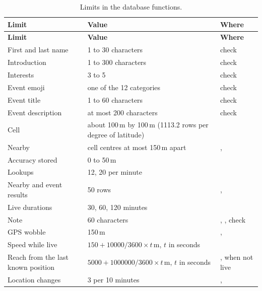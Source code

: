 \begingroup\tablefont
\begin{longtable}{@{}L{60mm}L{36mm}L{\dimexpr\linewidth-96mm-4\tabcolsep\relax}@{}}
  \caption{Limits in the database functions.}
  \label{tab:server-constants}\\
  \toprule
  \textsf{\textbf{Limit}} & \textsf{\textbf{Value}} & \textsf{\textbf{Where}} \\
  \midrule
  \endfirsthead
  \toprule
  \textsf{\textbf{Limit}} & \textsf{\textbf{Value}} & \textsf{\textbf{Where}} \\
  \midrule
  \endhead
  \bottomrule
  \endfoot
  First and last name & 1 to 30 characters &  check \\
  Introduction & 1 to 300 characters &  check \\
  Interests & 3 to 5 &  check \\
  Event emoji & one of the 12 categories &  check \\
  Event title & 1 to 60 characters &  check \\
  Event description & at most 200 characters &  check \\
  Cell & about 100\,m by 100\,m (1113.2 rows per degree of latitude) &  \\
  Nearby & cell centres at most 150\,m apart & ,  \\
  Accuracy stored & 0 to 50\,m &  \\
  Lookups &  12,  20 per minute &  \\
  Nearby and event results & 50 rows & ,  \\
  Live durations & 30, 60, 120 minutes &  \\
  Note & 60 characters & , , check \\
  GPS wobble & 150\,m & ,  \\
  Speed while live & $150 + 10000/3600 \times t$\,m, $t$ in seconds &  \\
  Reach from the last known position & $5000 + 1000000/3600 \times t$\,m, $t$ in seconds & ,  when not live \\
  Location changes & 3 per 10 minutes & ,  \\

\end{longtable}
